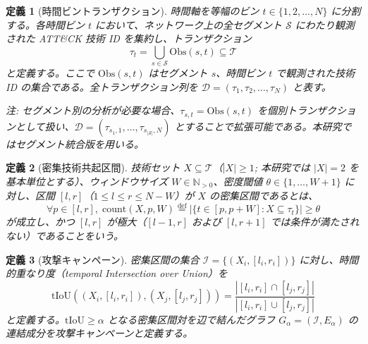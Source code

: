 \documentclass[11pt]{article}
\newtheorem{definition}{定義}
\begin{document}
\begin{definition}[時間ビントランザクション]\label{def:transaction}
時間軸を等幅のビン $t \in \{1, 2, \ldots, N\}$ に分割する。各時間ビン $t$ において、ネットワーク上の全セグメント $\mathcal{S}$ にわたり観測された ATT\&CK 技術 ID を集約し、トランザクション
\begin{equation}
\tau_t = \bigcup_{s \in \mathcal{S}} \mathrm{Obs}(s, t) \subseteq \mathcal{T}
\end{equation}
と定義する。ここで $\mathrm{Obs}(s, t)$ はセグメント $s$、時間ビン $t$ で観測された技術 ID の集合である。全トランザクション列を $\mathcal{D} = (\tau_1, \tau_2, \ldots, \tau_N)$ と表す。

\noindent\textit{注}: セグメント別の分析が必要な場合、$\tau_{s,t} = \mathrm{Obs}(s, t)$ を個別トランザクションとして扱い、$\mathcal{D} = (\tau_{s_1,1}, \ldots, \tau_{s_{|\mathcal{S}|},N})$ とすることで拡張可能である。本研究ではセグメント統合版を用いる。
\end{definition}

\begin{definition}[密集技術共起区間]\label{def:dense}
技術セット $X \subseteq \mathcal{T}$（$|X| \geq 1$; 本研究では $|X| = 2$ を基本単位とする）、ウィンドウサイズ $W \in \mathbb{N}_{>0}$、密度閾値 $\theta \in \{1, \ldots, W+1\}$ に対し、区間 $[l, r]$（$1 \leq l \leq r \leq N - W$）が $X$ の\emph{密集区間}であるとは、
\begin{equation}
\forall p \in [l, r], \; \mathrm{count}(X, p, W) \stackrel{\mathrm{def}}{=} |\{t \in [p, p+W] : X \subseteq \tau_t\}| \geq \theta
\end{equation}
が成立し、かつ $[l, r]$ が極大（$[l-1, r]$ および $[l, r+1]$ では条件が満たされない）であることをいう。
\end{definition}

\begin{definition}[攻撃キャンペーン]\label{def:campaign}
密集区間の集合 $\mathcal{I} = \{(X_i, [l_i, r_i])\}$ に対し、時間的重なり度（temporal Intersection over Union）を
\begin{equation}
\mathrm{tIoU}((X_i, [l_i, r_i]), (X_j, [l_j, r_j])) = \frac{|[l_i, r_i] \cap [l_j, r_j]|}{|[l_i, r_i] \cup [l_j, r_j]|}
\end{equation}
と定義する。$\mathrm{tIoU} \geq \alpha$ となる密集区間対を辺で結んだグラフ $G_\alpha = (\mathcal{I}, E_\alpha)$ の連結成分を\emph{攻撃キャンペーン}と定義する。
\end{definition}
\end{document}
